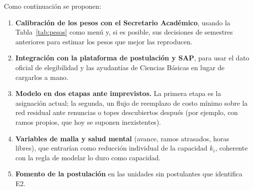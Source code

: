 \documentclass{article}
\begin{document}
Como continuación se proponen:

\begin{enumerate}
    \item \textbf{Calibración de los pesos con el Secretario Académico}, usando la Tabla~\ref{tab:pesos} como menú y, si es posible, sus decisiones de semestres anteriores para estimar los pesos que mejor las reproducen.
    \item \textbf{Integración con la plataforma de postulación y SAP}, para usar el dato oficial de elegibilidad y las ayudantías de Ciencias Básicas en lugar de cargarlos a mano.
    \item \textbf{Modelo en dos etapas ante imprevistos.} La primera etapa es la asignación actual; la segunda, un flujo de reemplazo de costo mínimo sobre la red residual ante renuncias o topes descubiertos después (por ejemplo, con ramos propios, que hoy se suponen inexistentes).
    \item \textbf{Variables de malla y salud mental} (avance, ramos atrasados, horas libres), que entrarían como reducción individual de la capacidad $k_i$, coherente con la regla de modelar lo duro como capacidad.
    \item \textbf{Fomento de la postulación} en las unidades sin postulantes que identifica E2.
\end{enumerate}
\end{document}

